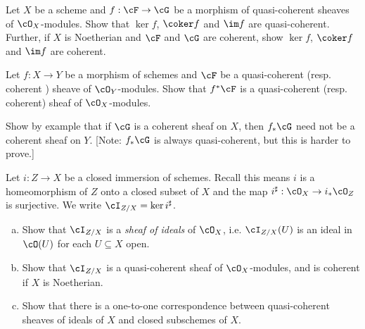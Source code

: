 \begin{homework}[e]
	 Let $X$ be a scheme and $f:\cF\to \cG$ be a morphism of quasi-coherent sheaves of $\cO_X$-modules. Show that $\ker f$, $\coker f$ and $\im f$ are quasi-coherent. Further, if $X$ is Noetherian and $\cF$ and $\cG$ are coherent, show $\ker f$, $\coker f$ and $\im f$ are coherent.

	\medskip

	\noindent Let $f:X\to Y$ be a morphism of schemes and $\cF$ be a quasi-coherent (resp. coherent ) sheave of $\cO_Y$-modules. Show that $f^*\cF$ is a quasi-coherent (resp. coherent) sheaf of $\cO_X$-modules.

	\medskip

	\noindent Show by example that if $\cG$ is a coherent sheaf on $X$, then $f_*\cG$ need not be a coherent sheaf on  $Y$. [Note: $f_*\cG$ is always quasi-coherent, but this is harder to prove.]

	 Let $i:Z\to X$ be a closed immersion of schemes. Recall this means $i$ is a homeomorphism of $Z$ onto a closed subset of $X$ and the map $i^\sharp:\cO_X\to i_*\cO_Z$ is surjective. We write $\cI_{Z/X} = \ker i^\sharp$.
	\begin{enumerate}[(a)]
		\item Show that $\cI_{Z/X}$ is a \textit{sheaf of ideals} of $\cO_X$, i.e. $\cI_{Z/X}(U)$ is an ideal in $\cO(U)$ for each $U\subseteq X$ open.
		\item Show that $\cI_{Z/X}$ is a quasi-coherent sheaf of $\cO_X$-modules, and is coherent if $X$ is Noetherian.
		\item Show that there is a one-to-one correspondence between quasi-coherent sheaves of ideals of $X$ and closed subschemes of $X$. 
	\end{enumerate}
\end{homework}
\newpage

